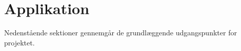 \cleardoublepage
{}
\setcounter{page}{1}
\part{Applikation}
Nedenstående sektioner gennemgår de grundlæggende udgangspunkter for projektet.  



